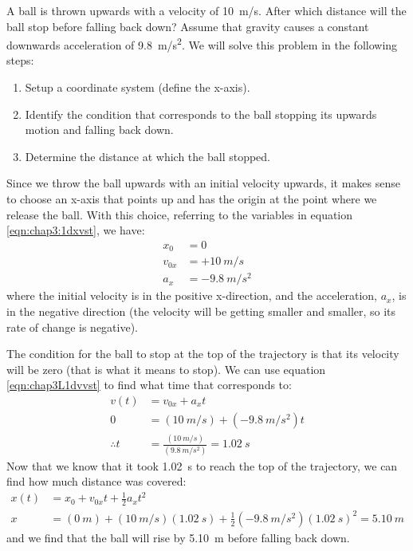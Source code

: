 \begin{example}{A ball is thrown upwards with a velocity of \SI{10}{m/s}. After which distance will the ball stop before falling back down? Assume that gravity causes a constant downwards acceleration of \SI{9.8}{m/s^2}.}
\label{ex:chap3:ballupandown}
We will solve this problem in the following steps:
\begin{enumerate}[topsep=-10pt]
\item Setup a coordinate system (define the x-axis).
\item Identify the condition that corresponds to the ball stopping its upwards motion and falling back down.
\item Determine the distance at which the ball stopped.
\end{enumerate}
Since we throw the ball upwards with an initial velocity upwards, it makes sense to choose an x-axis that points up and has the origin at the point where we release the ball. With this choice, referring to the variables in equation \ref{eqn:chap3:1dxvst}, we have:
\begin{align*}
x_0&=0\\
v_{0x}&=+\SI{10}{m/s}\\
a_x&=\SI{-9.8}{m/s^2}
\end{align*}
where the initial velocity is in the positive x-direction, and the acceleration, $a_x$, is in the negative direction (the velocity will be getting smaller and smaller, so its rate of change is negative).

The condition for the ball to stop at the top of the trajectory is that its velocity will be zero (that is what it means to stop). We can use equation \ref{eqn:chap3L1dvvst} to find what time that corresponds to:
\begin{align*}
v(t) &= v_{0x}+a_xt\\
0 &= (\SI{10}{m/s}) + (\SI{-9.8}{m/s^2})t\\
\therefore t&=\frac{(\SI{10}{m/s})}{(\SI{9.8}{m/s^2})}=\SI{1.02}{s}
\end{align*}
Now that we know that it took \SI{1.02}{s} to reach the top of the trajectory, we can find how much distance was covered:
\begin{align*}
x(t) &= x_0+v_{0x}t+ \frac{1}{2}a_xt^2\\
x &= (\SI{0}{m})+(\SI{10}{m/s})(\SI{1.02}{s})+\frac{1}{2}(\SI{-9.8}{m/s^2})(\SI{1.02}{s})^2 = \SI{5.10}{m}
\end{align*}
and we find that the ball will rise by \SI{5.10}{m} before falling back down. 
\end{example}


